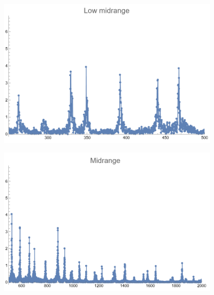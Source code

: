 \documentclass[12pt, letterpaper]{article}
\begin{document}
\begin{figure}[H]
  \centering
  \begin{minipage}{.5\textwidth}
    \centering
    \includegraphics[width=.9\linewidth]{imgs/Cancion3/lowmid.png}
    \label{fig:03d}
  \end{minipage}%
  \begin{minipage}{.5\textwidth}
    \centering
    \includegraphics[width=.9\linewidth]{imgs/Cancion3/mid.png}
    \label{fig:03e}
  \end{minipage}
\end{figure}
\end{document}
